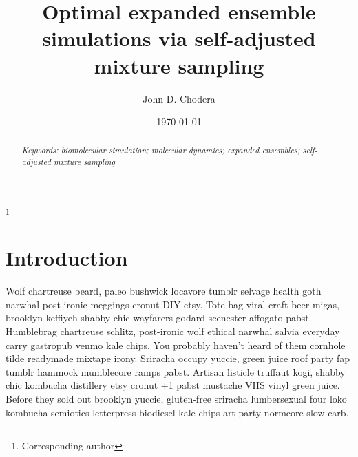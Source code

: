 \documentclass[aps,pre,twocolumn,nofootinbib,superscriptaddress,linenumbers,11point]{revtex4-1}
\begin{document}

\title{Optimal expanded ensemble simulations via self-adjusted mixture sampling}

\author{John D. Chodera}
 \thanks{Corresponding author}

\date{\today}


\begin{abstract}


\emph{Keywords: biomolecular simulation; molecular dynamics; expanded ensembles; self-adjusted mixture sampling}

\end{abstract}

\maketitle




\section*{Introduction}
\label{section:introduction}

Wolf chartreuse beard, paleo bushwick locavore tumblr selvage health goth narwhal post-ironic meggings cronut DIY etsy. 
Tote bag viral craft beer migas, brooklyn keffiyeh shabby chic wayfarers godard scenester affogato pabst. 
Humblebrag chartreuse schlitz, post-ironic wolf ethical narwhal salvia everyday carry gastropub venmo kale chips. You probably haven't heard of them cornhole tilde readymade mixtape irony. 
Sriracha occupy yuccie, green juice roof party fap tumblr hammock mumblecore ramps pabst. Artisan listicle truffaut kogi, shabby chic kombucha distillery etsy cronut +1 pabst mustache VHS vinyl green juice. 
Before they sold out brooklyn yuccie, gluten-free sriracha lumbersexual four loko kombucha semiotics letterpress biodiesel kale chips art party normcore slow-carb.
\end{document}
